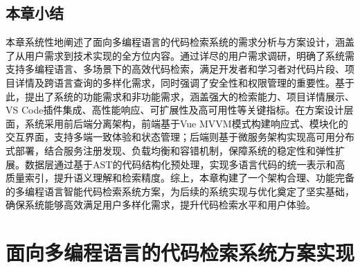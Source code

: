 \documentclass[UTF8,a4paper,12pt]{ctexart}
\numberwithin{equation}{section}
\begin{document}
\subsection{本章小结}
本章系统性地阐述了面向多编程语言的代码检索系统的需求分析与方案设计，涵盖了从用户需求到技术实现的全方位内容。通过详尽的用户需求调研，明确了系统需支持多编程语言、多场景下的高效代码检索，满足开发者和学习者对代码片段、项目详情及跨语言查询的多样化需求，同时强调了安全性和权限管理的重要性。基于此，提出了系统的功能需求和非功能需求，涵盖强大的检索能力、项目详情展示、VS Code插件集成、高性能响应、可扩展性及高可用性等关键指标。在方案设计层面，系统采用前后端分离架构，前端基于Vue MVVM模式构建响应式、模块化的交互界面，支持多端一致体验和状态管理；后端则基于微服务架构实现高可用分布式部署，结合服务注册发现、负载均衡和容错机制，保障系统的稳定性和弹性扩展。数据层通过基于AST的代码结构化预处理，实现多语言代码的统一表示和高质量索引，提升语义理解和检索精度。综上，本章构建了一个架构合理、功能完备的多编程语言智能代码检索系统方案，为后续的系统实现与优化奠定了坚实基础，确保系统能够高效满足用户多样化需求，提升代码检索水平和用户体验。\par
\section{面向多编程语言的代码检索系统方案实现}
\end{document}
